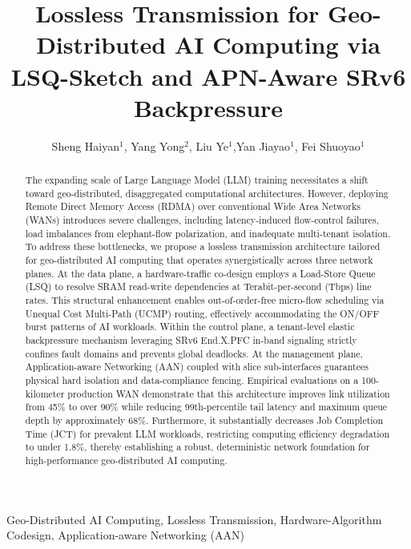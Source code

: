 \documentclass[a4paper]{jpconf}
\begin{document}
\title{Lossless Transmission for Geo-Distributed AI Computing via LSQ-Sketch and APN-Aware SRv6 Backpressure}


\author{Sheng Haiyan$^1$, Yang Yong$^2$, Liu Ye$^1$,Yan Jiayao$^1$, Fei Shuoyao$^1$}


\address{$^1$ Century College, Beijing University of Posts and Telecommunications, Beijing, 100876, China}
\address{$^2$ China Mobile Communications Group Beijing Co., Ltd., Beijing, 100032, China}


\begin{abstract}
The expanding scale of Large Language Model (LLM) training necessitates a shift toward geo-distributed, disaggregated computational architectures. However, deploying Remote Direct Memory Access (RDMA) over conventional Wide Area Networks (WANs) introduces severe challenges, including latency-induced flow-control failures, load imbalances from elephant-flow polarization, and inadequate multi-tenant isolation. To address these bottlenecks, we propose a lossless transmission architecture tailored for geo-distributed AI computing that operates synergistically across three network planes. At the data plane, a hardware-traffic co-design employs a Load-Store Queue (LSQ) to resolve SRAM read-write dependencies at Terabit-per-second (Tbps) line rates. This structural enhancement enables out-of-order-free micro-flow scheduling via Unequal Cost Multi-Path (UCMP) routing, effectively accommodating the ON/OFF burst patterns of AI workloads. Within the control plane, a tenant-level elastic backpressure mechanism leveraging SRv6 End.X.PFC in-band signaling strictly confines fault domains and prevents global deadlocks. At the management plane, Application-aware Networking (AAN) coupled with slice sub-interfaces guarantees physical hard isolation and data-compliance fencing. Empirical evaluations on a 100-kilometer production WAN demonstrate that this architecture improves link utilization from 45\% to over 90\% while reducing 99th-percentile tail latency and maximum queue depth by approximately 68\%. Furthermore, it substantially decreases Job Completion Time (JCT) for prevalent LLM workloads, restricting computing efficiency degradation to under 1.8\%, thereby establishing a robust, deterministic network foundation for high-performance geo-distributed AI computing.
\end{abstract}

 Geo-Distributed AI Computing, Lossless Transmission, Hardware-Algorithm Codesign, Application-aware Networking (AAN)
\end{document}
